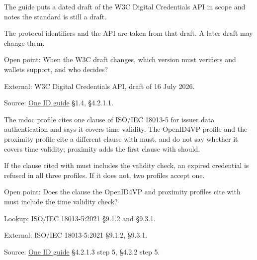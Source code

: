 \begin{definition}
  \label{def:c100}
  \notready
  The guide puts a dated draft of the W3C Digital Credentials API in scope
  and notes the standard is still a draft.

  The protocol identifiers and the API are taken from that draft. A later
  draft may change them.

  Open point: When the W3C draft changes, which version must verifiers and
  wallets support, and who decides?

  External: W3C Digital Credentials API, draft of 16 July 2026.

  Source:
  \href{https://standards.atlassian.net/wiki/spaces/OneID/pages/2947416082/Technical+Implementation+Guide}{One
  ID guide} §1.4, §4.2.1.1.
\end{definition}

\begin{definition}
  \label{def:c101}
  \notready
  The mdoc profile cites one clause of ISO/IEC 18013-5 for issuer data
  authentication and says it covers time validity. The OpenID4VP profile and
  the proximity profile cite a different clause with must, and do not say
  whether it covers time validity; proximity adds the first clause with
  should.

  If the clause cited with must includes the validity check, an expired
  credential is refused in all three profiles. If it does not, two profiles
  accept one.

  Open point: Does the clause the OpenID4VP and proximity profiles cite with
  must include the time validity check?

  Lookup: ISO/IEC 18013-5:2021 §9.1.2 and §9.3.1.

  External: ISO/IEC 18013-5:2021 §9.1.2, §9.3.1.

  Source:
  \href{https://standards.atlassian.net/wiki/spaces/OneID/pages/2947416082/Technical+Implementation+Guide}{One
  ID guide} §4.2.1.3 step 5, §4.2.2 step 5.
\end{definition}

